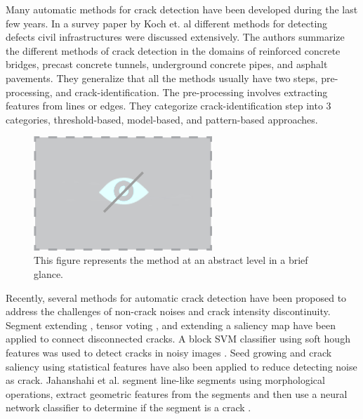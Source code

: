     Many automatic methods for crack detection have been developed during the last few years. In a survey paper by Koch et. al \cite{Koch:2015} different methods for detecting defects civil infrastructures  were discussed extensively. The authors summarize the different methods of crack detection in the domains of reinforced concrete bridges, precast concrete tunnels, underground concrete pipes, and asphalt pavements. They generalize that all the methods usually have two steps, pre-processing, and crack-identification. The pre-processing involves extracting features from lines or edges. They categorize crack-identification step into 3 categories, threshold-based, model-based, and pattern-based approaches. 

\begin{figure}
\begin{centering}
\includegraphics[width=0.6\textwidth]{Images/NoVisualHolder.png}
\caption{This figure represents the method at an abstract level in a brief glance.}
\label{fig:FigMain}
\end{centering}
\end{figure}

    Recently, several methods for automatic crack detection have been proposed to address the challenges of non-crack noises and crack intensity discontinuity. Segment extending \cite{Liu2008}, tensor voting \cite{Zou2012}, and extending a saliency map \cite{Xu2013} have been applied to connect disconnected cracks. A block SVM classifier using soft hough features was used to detect cracks in noisy images \cite{Hu2010}. Seed growing \cite{Li2011} and crack saliency \cite{Xu2013} using statistical features have also been applied to reduce detecting noise as crack. Jahanshahi et al. segment line-like segments using morphological operations, extract geometric features from the segments and then use a neural network classifier to determine if the segment is a crack \cite{jahanshahi2013}.

